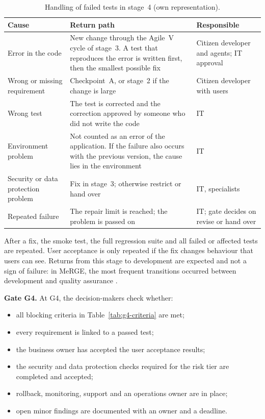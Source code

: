 \documentclass[10pt,a4paper]{article}
\begin{document}
\begin{table}[H]
    \centering
    \small
    \caption{Handling of failed tests in stage~4 (own representation).}
    \label{tab:g4-failures}
    \begin{tabular}{p{3.2cm} p{6.6cm} p{4.0cm}}
    \hline
    \textbf{Cause} & \textbf{Return path} & \textbf{Responsible} \\
    \hline
    Error in the code & New change through the Agile~V cycle of stage~3. A test that reproduces the
        error is written first, then the smallest possible fix
        \parencite{koch2026agentic} & Citizen developer and agents; IT
        approval \\
    Wrong or missing requirement & Checkpoint~A, or stage~2 if the change
        is large & Citizen developer with users \\
    Wrong test & The test is corrected and the correction approved by
        someone who did not write the code & IT \\
    Environment problem & Not counted as an error of the application. If
        the failure also occurs with the previous version, the cause lies in
        the environment \parencite{TODO-kitchenloop} & IT \\
    Security or data protection problem & Fix in stage~3; otherwise restrict
        or hand over & IT, specialists \\
    Repeated failure & The repair limit is reached; the problem is passed on
        & IT; gate decides on revise or hand over \\
    \hline
    \end{tabular}
\end{table}

After a fix, the smoke test, the full regression suite and all failed or
affected tests are repeated. User acceptance is only repeated if the fix
changes behaviour that users can see. Returns from this stage to development
are expected and not a sign of failure: in MeRGE, the most frequent
transitions occurred between development and quality assurance
\parencite{fetzer2026}.

\textbf{Gate G4.} At G4, the decision-makers check whether:

\begin{itemize}
    \item all blocking criteria in Table~\ref{tab:g4-criteria} are met;
    \item every requirement is linked to a passed test;
    \item the business owner has accepted the user acceptance results;
    \item the security and data protection checks required for the risk tier
    are completed and accepted;
    \item rollback, monitoring, support and an operations owner are in place;
    \item open minor findings are documented with an owner and a deadline.
\end{itemize}
\end{document}
